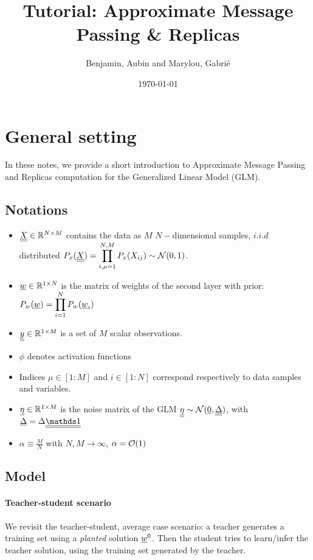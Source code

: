 \documentclass[aip,jmp,amsmath,amssymb,reprint]{revtex4}
\begin{document}
\title{\huge Tutorial: Approximate Message Passing \& Replicas}
\author{Benjamin, Aubin and Marylou, Gabrié}
\date{\today}
\maketitle

\tableofcontents
\newpage



\section{\Large General setting}
 In these notes, we provide a short introduction to Approximate Message Passing and Replicas computation for the Generalized Linear Model (GLM). \\
  
\subsection{Notations}
\begin{itemize}
	\item $\underline{\underline{X}} \in \mathbb{R}^{N \times M}$ contains the data as $M$ $N-$dimensional samples, $i.i.d$ distributed  $P_x(\underline{\underline{X}}) = \displaystyle \prod_{i,\mu=1}^{N,M} P_x(X_{ij})\sim \mathcal{N}(0,1)$.
	\item ${\underline{w}}\in \mathbb{R}^{1 \times N}$ is the matrix of weights of the second layer with prior: $P_w({\underline{w}})= \displaystyle \prod_{i=1}^N P_w({\underline{w}}_i)$
	\item $\underline{\underline{y}} \in \mathbb{R}^{1 \times M}$ is a set of $M$ scalar observations.
	\item $\phi$ denotes activation functions
	\item Indices $\mu \in [1:M]$ and $i\in[1:N]$ correspond respectively to data samples and variables.
	\item ${\underline{\eta}} \in \mathbb{R}^{1 \times M} $ is the noise matrix of the GLM $\underline{\underline{\eta}} \sim \mathcal{N}({\underline{0}},\underline{\underline{\Delta}})$, with $\ud{\Delta} = \Delta \du{\id}$ 
	\item $\alpha \equiv \frac{M}{N}$ with $N, M \to \infty$, $\alpha= \mathcal{O}(1)$
\end{itemize}


\subsection{Model}
\paragraph{Teacher-student scenario}
We revisit the teacher-student, average case scenario: a teacher generates a training set using a \textit{planted} solution ${\underline{w}}^0$. Then the student tries to learn/infer the teacher solution, using the training set generated by the teacher.
\end{document}
